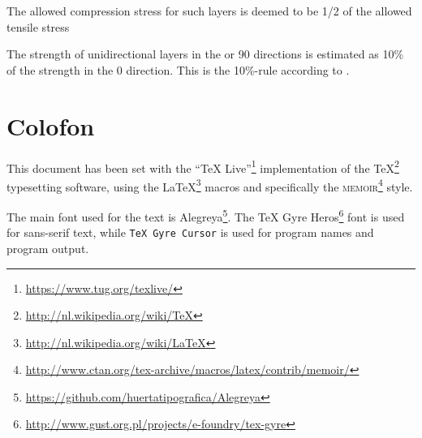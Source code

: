 \documentclass[a4paper,landscape,oneside,11pt,twocolumn]{memoir}
\begin{document}
The allowed compression stress for such layers is deemed to be 1/2 of the
allowed tensile stress

The strength of unidirectional layers in the \textdegree{} or
90\textdegree{} directions is estimated as 10\% of the strength in the
0\textdegree{} direction. This is the 10\%-rule according to
\citet{1992WeiEn..52...29H}.

%

\chapter{Colofon}

This document has been set with the “TeX
Live”\footnote{\url{https://www.tug.org/texlive/}} implementation of the
\TeX\footnote{\url{http://nl.wikipedia.org/wiki/TeX}} typesetting software,
using the \LaTeX\footnote{\url{http://nl.wikipedia.org/wiki/LaTeX}} macros and
specifically the \textsc{memoir}\footnote{%
    \url{http://www.ctan.org/tex-archive/macros/latex/contrib/memoir/}} style.

The main font used for the text is
Alegreya\footnote{\url{https://github.com/huertatipografica/Alegreya}}.  The
\textsf{TeX Gyre
Heros}\footnote{\url{http://www.gust.org.pl/projects/e-foundry/tex-gyre}} font
is used for sans-serif text, while \texttt{TeX Gyre Cursor} is used for
program names and program output.
\end{document}
